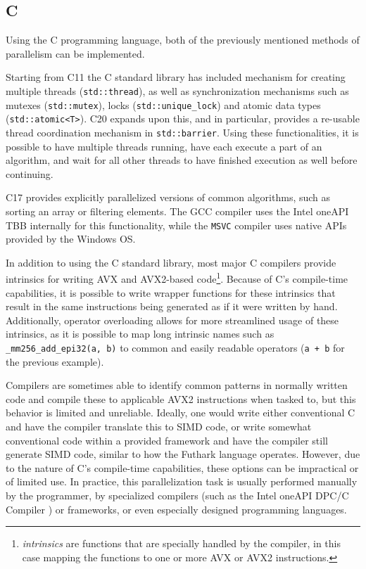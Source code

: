 \documentclass[11pt,dvipsnames]{article}
\newcommand{\icpp}[1]{\texttt{#1}}
\newcommand{\mono}[1]{\texttt{#1}}
\newcommand{\Rplus}{\protect\hspace{-.1em}\protect\raisebox{.35ex}{\smaller{\smaller\textbf{+}}}}
\newcommand{\Cpp}{\mbox{C\Rplus\Rplus}\xspace}
\newcommand{\CppXI}{\mbox{C\Rplus\Rplus11}\xspace}
\newcommand{\CppXVII}{\mbox{C\Rplus\Rplus17}\xspace}
\newcommand{\CppXX}{\mbox{C\Rplus\Rplus20}\xspace}
\begin{document}
\subsection{\texorpdfstring{\Cpp}{C++}}
Using the \Cpp programming language, both of the previously mentioned methods of parallelism can be implemented.

Starting from \CppXI the \Cpp standard library has included mechanism for creating multiple threads (\icpp{std::thread}), as well as synchronization mechanisms such as mutexes (\icpp{std::mutex}), locks \linebreak (\icpp{std::unique_lock}) and atomic data types (\icpp{std::atomic<T>}). \CppXX expands upon this, and in particular, provides a re-usable thread coordination mechanism in \icpp{std::barrier}. Using these functionalities, it is possible to have multiple threads running, have each execute a part of an algorithm, and wait for all other threads to have finished execution as well before continuing.

\CppXVII provides explicitly parallelized versions of common algorithms, such as sorting an array or filtering elements. The GCC compiler uses the Intel oneAPI TBB \cite{oneapi} internally for this functionality, while the \mono{MSVC} compiler uses native APIs provided by the Windows OS.

In addition to using the \Cpp standard library, most major \Cpp compilers provide intrinsics for writing AVX and AVX2-based code\footnote{\textit{intrinsics} are functions that are specially handled by the compiler, in this case mapping the functions to one or more AVX or AVX2 instructions.}. Because of \Cpp's compile-time capabilities, it is possible to write wrapper functions for these intrinsics that result in the same instructions being generated as if it were written by hand. Additionally, operator overloading allows for more streamlined usage of these intrinsics, as it is possible to map long intrinsic names such as \icpp{_mm256_add_epi32(a, b)} to common and easily readable operators (\icpp{a + b} for the previous example).

Compilers are sometimes able to identify common patterns in normally written code and compile these to applicable AVX2 instructions when tasked to, but this behavior is limited and unreliable. Ideally, one would write either conventional \Cpp and have the compiler translate this to SIMD code, or write somewhat conventional code within a provided framework and have the compiler still generate SIMD code, similar to how the Futhark language operates. However, due to the nature of \Cpp's compile-time capabilities, these options can be impractical or of limited use. In practice, this parallelization task is usually performed manually by the programmer, by specialized compilers (such as the Intel oneAPI DP\Cpp/\Cpp Compiler \cite{intelcompiler}) or frameworks, or even especially designed programming languages.
\end{document}
